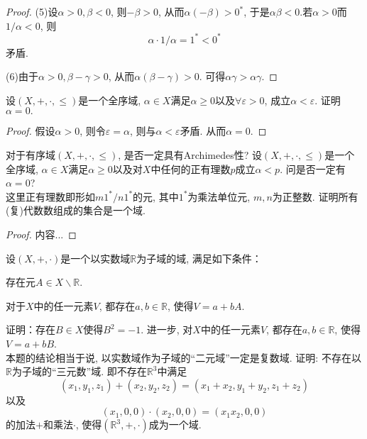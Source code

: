 \begin{quiza}
\begin{proof}
(5)设\(\alpha>0,\beta<0\), 则\(-\beta>0\), 从而\(\alpha(-\beta)>0^*\), 于是\(\alpha\beta<0\).若\(\alpha>0\)而\(1/\alpha<0\), 则\[\alpha\cdot 1/\alpha=1^*<0^*\]矛盾.

(6)由于\(\alpha>0,\beta-\gamma>0\), 从而\(\alpha(\beta-\gamma)>0\). 可得\(\alpha\gamma>\alpha\gamma.\)
\end{proof}
\woe 设\((X,+,\cdot,\leqslant)\)是一个全序域, \(\alpha\in X\)满足\(\alpha\geqslant 0\)以及\(\forall \varepsilon>0\), 成立\(\alpha<\varepsilon\). 证明\(\alpha=0.\)
\begin{proof}
假设\(\alpha>0\), 则令\(\varepsilon=\alpha\), 则与\(\alpha<\varepsilon\)矛盾. 从而\(\alpha=0\).
\end{proof}
\end{quiza}
\begin{quizb}
\woe 对于有序域\((X,+,\cdot,\leqslant)\), 是否一定具有Archimedes性?
\woe 设\((X,+,\cdot,\leqslant)\)是一个全序域, \(\alpha\in X\)满足\(\alpha\geqslant 0\)以及对\(X\)中任何的正有理数\(p\)成立\(\alpha<p\). 问是否一定有\(\alpha=0\)?\\ 这里正有理数即形如\(m1^*/n1^*\)的元, 其中\(1^*\)为乘法单位元, \(m,n\)为正整数.
\woe 证明所有(复)代数数组成的集合是一个域.
\begin{proof}
内容...
\end{proof}
\woe 设\((X,+,\cdot)\)是一个以实数域\(\mathbb{R}\)为子域的域, 满足如下条件：\begin{compactenum}[(i)]
\item 存在元\(A\in X\backslash\mathbb{R}\).
\item 对于\(X\)中的任一元素\(V\), 都存在\(a,b\in \mathbb{R}\), 使得\(V=a+bA\).
\end{compactenum}
证明：存在\(B\in X\)使得\(B^2=-1\). 进一步, 对\(X\)中的任一元素\(V\), 都存在\(a,b\in \mathbb{R}\), 使得\(V=a+bB\).\\本题的结论相当于说, 以实数域作为子域的“二元域”一定是复数域.
\woe 证明: 不存在以\(\mathbb{R}\)为子域的“三元数”域. 即不存在\(\mathbb{R}^3\)中满足\[(x_1,y_1,z_1)+(x_2,y_2,z_2)=(x_1+x_2,y_1+y_2,z_1+z_2)\]以及\[(x_1,0,0)\cdot (x_2,0,0)=(x_1x_2,0,0)\]的加法\(+\)和乘法\(\cdot\), 使得\((\mathbb{R}^3,+,\cdot)\)成为一个域.
\end{quizb}
